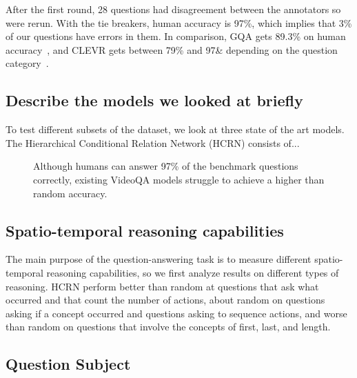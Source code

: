 \documentclass[10pt,twocolumn,letterpaper]{article}
\newcommand{\mgm}[1]{{\color{cyan}{mgm: #1}}}
\begin{document}
After the first round, 28 questions had disagreement between the annotators so were rerun. With the tie breakers, human accuracy is 97\%, which implies that 3\% of our questions have errors in them. In comparison, GQA gets 89.3\% on human accuracy~\cite{hudson2019gqa}, and CLEVR gets between 79\% and 97\& depending on the question category~\cite{johnson2017clevr}. 


\subsection{Describe the models we looked at briefly}

To test different subsets of the dataset, we look at three state of the art models. The Hierarchical Conditional Relation Network (HCRN) consists of... 


\mgm{Is it necessary to do this? CLEVR did, GQA did not}
%

\begin{figure}[t]
\begin{center}
\resizebox{\linewidth}{!}{

}
\end{center}
   \caption{Although humans can answer 97\% of the benchmark questions correctly, existing VideoQA models struggle to achieve a higher than random accuracy.}
\label{table:global}
\end{figure}



\subsection{Spatio-temporal reasoning capabilities}
The main purpose of the question-answering task is to measure different spatio-temporal reasoning capabilities, so we first analyze results on different types of reasoning. HCRN perform better than random at questions that ask what occurred and that count the number of actions, about random on questions asking if a concept occurred and questions asking to sequence actions, and worse than random on questions that involve the concepts of first, last, and length. 



\textbf{}
\subsection{Question Subject}
\end{document}
